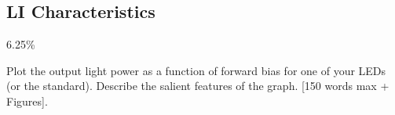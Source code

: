 \subsection{LI Characteristics}
\label{sec:test:li}

6.25\%

Plot the output light power as a function of forward bias for one of your LEDs (or the standard). Describe the salient features of the graph. [150 words max + Figures].


